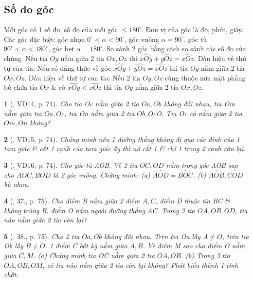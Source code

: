 \documentclass{article}
\newtheorem{baitoan}{}
\begin{document}

\subsection{Số đo góc}
 Mỗi góc có 1 số đo, số đo của mỗi góc $\le180^\circ$. Đơn vị của góc là độ, phút, giây. Các góc đặc biệt: góc nhọn $0^\circ < \alpha < 90^\circ$, góc vuông $\alpha = 90^\circ$, góc tù $90^\circ < \alpha < 180^\circ$, góc bẹt $\alpha = 180^\circ$.  So sánh 2 góc bằng cách so sánh các số đo của chúng.  Nếu tia $Oy$ nằm giữa 2 tia $Ox,Oz$ thì $\widehat{xOy} + \widehat{yOz} = \widehat{xOz}$.  {\sf Dấu hiệu về thứ tự của tia}: Nếu có đẳng thức về góc $\widehat{xOy} + \widehat{yOz} = \widehat{xOz}$ thì tia $Oy$ nằm giữa 2 tia $Ox,Oz$.  {\sf Dấu hiệu về thứ tự của tia}: Nếu 2 tia $Oy,Oz$ cùng thuộc nửa mặt phẳng bờ chứa tia $Ox$ \& có $\widehat{xOy} < \widehat{xOz}$ thì tia $Oy$ nằm giữa 2 tia $Ox,Oz$.

\begin{baitoan}[\cite{Binh_Toan_6_tap_2}, VD14, p. 74]
	Cho tia Oc nằm giữa 2 tia $Oa,Ob$ không đối nhau, tia Om nằm giữa tia $Oa,Oc$, tia On nằm giữa 2 tia $Ob,Oc$O. Tia Oc có nằm giữa 2 tia $Om,On$ không?
\end{baitoan}

\begin{baitoan}[\cite{Binh_Toan_6_tap_2}, VD15, p. 74]
	Chứng minh nếu 1 đường thẳng không đi qua các đỉnh của 1 tam giác \& cắt 1 cạnh của tam giác ấy thì nó cắt 1 \& chỉ 1 trong 2 cạnh còn lại.
\end{baitoan}

\begin{baitoan}[\cite{Binh_Toan_6_tap_2}, VD16, p. 74]
	Cho góc tù AOB. Vẽ 2 tia $OC,OD$ nằm trong góc AOB sao cho $AOC,BOD$ là 2 góc vuông. Chứng minh: (a) $\widehat{AOD} = \widehat{BOC}$. (b) $\widehat{AOB},\widehat{COD}$ bù nhau.
\end{baitoan}

\begin{baitoan}[\cite{Binh_Toan_6_tap_2}, 37., p. 75]
	Cho điểm B nằm giữa 2 điểm $A,C$, điểm D thuộc tia BC \& không trùng B, điểm O nằm ngoài đường thẳng AC. Trong 3 tia $OA,OB,OD$, tia nào nằm giữa 2 tia còn lại?
\end{baitoan}

\begin{baitoan}[\cite{Binh_Toan_6_tap_2}, 38., p. 75]
	Cho 2 tia $Oa,Ob$ không đối nhau. Trên tia Oa lấy $A\ne O$, trên tia Ob lấy $B\ne O$. 1 điểm C bất kỳ nằm giữa $A,B$. Vẽ điểm M sao cho điểm O nằm giữa $C,M$. (a) Chứng minh tia OC nằm giữa 2 tia $OA,OB$. (b) Trong 3 tia $OA,OB,OM$, có tia nào nằm giữa 2 tia còn lại không? Phát biểu thành 1 tính chất.
\end{baitoan}
\end{document}
